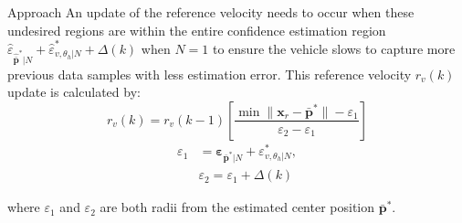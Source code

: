 \begin{section}{Approach}
An update of the reference velocity needs to occur when these undesired regions are within the entire confidence estimation region $ \hat{\varepsilon}_{\hat{\bar{\bm{p}}}^*|N} +\hat{\varepsilon}_{v,\theta_h|N}^{*}+\Delta(k)$ when $N=1$ to ensure the vehicle slows to capture more previous data samples with less estimation error. This reference velocity $r_v(k)$ update is calculated by:
    \begin{equation}
	    r_v(k)=r_v(k-1) \left[ \frac{ \min \lVert \bm{x}_r - \bar{\bm{p}}^* \rVert - \varepsilon_1}{\varepsilon_2 - \varepsilon_1} \right]
	\end{equation}
	\begin{equation}
	\begin{split}
	    \varepsilon_1&=\bm{\varepsilon}_{\bar{\bm{p}}^*|N} +\varepsilon_{v,\theta_h|N}^{*},\\ &\varepsilon_2=\varepsilon_1+\Delta(k) \nonumber	    
	\end{split}
	\end{equation}
	
where $\varepsilon_1$ and $\varepsilon_2$ are both radii from the estimated center position $\bar{\bm{p}}^*$.
	





\end{section}
